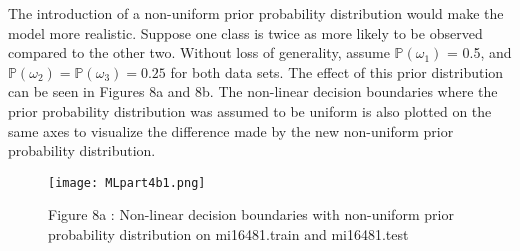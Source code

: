                                                                                                             The introduction of a non-uniform prior probability distribution would make the model more realistic. Suppose one class is twice as more likely to be observed compared to the other two. Without loss of generality, assume $\mathbb{P}( \omega_{1})$ = 0.5, and $\mathbb{P}( \omega_{2}) = \mathbb{P}( \omega_{3}) = 0.25$ for both data sets. The effect of this prior distribution can be
                                                                                                            seen in Figures 8a and 8b. The non-linear decision boundaries where the prior probability distribution was assumed to be uniform is also plotted on the same axes to visualize the difference made by the new non-uniform prior probability distribution. 
                                                                                                            \\
                                                                                                            \begin{wrapfigure}{}{\textwidth}
                                                                                                              \begin{center}
                                                                                                                  \texttt{[image: MLpart4b1.png]}
                                                                                                                        \caption{Figure 8a : Non-linear decision boundaries with non-uniform prior probability distribution on mi16481.train and mi16481.test}
                                                                                                                        \end{center}
                                                                                                                        \end{wrapfigure}
                                                                                                                        \\ \vspace{5mm}
